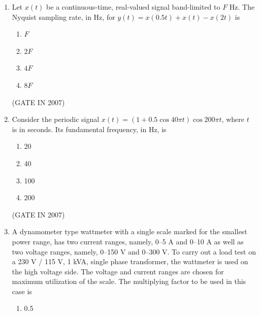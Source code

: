 \documentclass[journal]{IEEEtran}
\begin{document}
\begin{enumerate}
\begin{figure}[H]
      \caption{}
    \label{fig:fig9} 
\end{figure}
The boolean logic function realized by the circuit is
\begin{multicols}{4}
\begin{enumerate}
\item AND  
\item NAND  
\item NOR  
\item OR  
\end{enumerate}
\end{multicols}
\hfill(GATE IN 2007)

\item Let $x(t)$ be a continuous-time, real-valued signal band-limited to $F$ Hz.  
The Nyquist sampling rate, in Hz, for $y(t) = x(0.5t) + x(t) - x(2t)$ is
\begin{multicols}{4}
\begin{enumerate}
\item $F$  
\item $2F$  
\item $4F$  
\item $8F$  
\end{enumerate}
\end{multicols}
\hfill(GATE IN 2007)
\item Consider the periodic signal $x(t) = (1 + 0.5\cos 40\pi t)\cos 200\pi t$, where $t$ is in seconds.  
Its fundamental frequency, in Hz, is
\begin{multicols}{4}
\begin{enumerate}
\item 20  
\item 40  
\item 100  
\item 200  
\end{enumerate}
\end{multicols}
\hfill(GATE IN 2007)
\item A dynamometer type wattmeter with a single scale marked for the smallest power range, has two current ranges, namely, 0--5 A and 0--10 A as well as two voltage ranges, namely, 0--150 V and 0--300 V.  
To carry out a load test on a 230 V / 115 V, 1 kVA, single phase transformer, the wattmeter is used on the high voltage side.  
The voltage and current ranges are chosen for maximum utilization of the scale. The multiplying factor to be used in this case is
\begin{multicols}{4}
\begin{enumerate}
\item 0.5  

\end{enumerate}
\end{multicols}
\end{enumerate}
\end{document}
